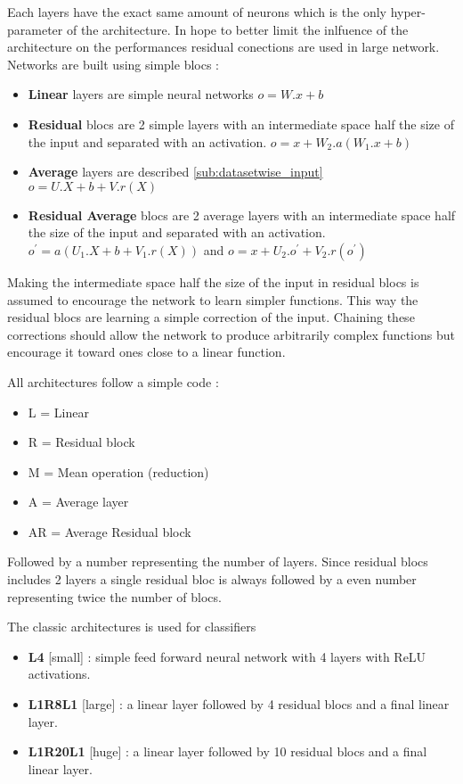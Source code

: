 Each layers have the exact same amount of neurons which is the only hyper-parameter of the architecture.
In hope to better limit the inlfuence of the architecture on the performances residual conections are used in large network.
Networks are built using simple blocs :
\begin{itemize}
	\item \textbf{Linear} layers are simple neural networks $o = W.x + b$
	\item \textbf{Residual} blocs are 2 simple layers with an intermediate space half the size of the input and separated with an activation. $o = x + W_2 . a(W_1.x + b)$
	\item \textbf{Average} layers are described \autoref{sub:datasetwise_input} $o = U.X+b+V.r(X)$
	\item \textbf{Residual Average} blocs are 2 average layers with an intermediate space half the size of the input and separated with an activation. $o^\prime = a( U_1.X+b+V_1.r(X) )$ and $o = x + U_2.o^\prime + V_2.r(o^\prime) $
\end{itemize}
Making the intermediate space half the size of the input in residual blocs is assumed to encourage the network to learn simpler functions.
This way the residual blocs are learning a simple correction of the input.
Chaining these corrections should allow the network to produce arbitrarily complex functions but encourage it toward ones close to a linear function.

All architectures follow a simple code :
\begin{itemize}
	\item L = Linear
	\item R = Residual block
	\item M = Mean operation (reduction)
	\item A = Average layer
	\item AR = Average Residual block
\end{itemize}
Followed by a number representing the number of layers.
Since residual blocs includes 2 layers a single residual bloc is always followed by a even number representing twice the number of blocs.

The classic architectures is used for classifiers
\begin{itemize}
	\item \textbf{L4} [small] : simple feed forward neural network with 4 layers with ReLU activations.
	\item \textbf{L1R8L1} [large] : a linear layer followed by 4 residual blocs and a final linear layer.
	\item \textbf{L1R20L1} [huge] : a linear layer followed by 10 residual blocs and a final linear layer.
\end{itemize}

